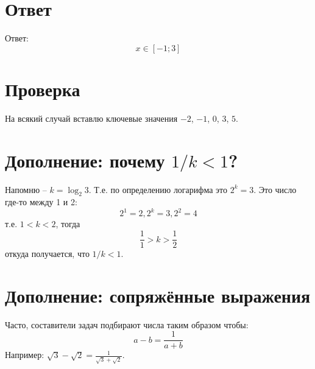 \documentclass{article}
\begin{document}
\section{Ответ}
Ответ:
$$x\in{}[-1;3]$$

\section{Проверка}
На всякий случай вставлю ключевые значения $-2$, $-1$, $0$, $3$, $5$.

\section{Дополнение: почему $1/k<1$?}
Напомню -- $k=\log_{2}{3}$. Т.е. по определению логарифма это $2^k=3$. Это число где-то между 1 и 2:
$$2^1=2, 2^k=3, 2^2=4$$
т.е. $1<k<2$, тогда
$$\frac{1}{1}>k>\frac{1}{2}$$
откуда получается, что $1/k<1$.

\section{Дополнение: сопряжённые выражения}
Часто, составители задач подбирают числа таким образом чтобы:
$$a-b=\frac{1}{a+b}$$
Например: $\sqrt{3}-\sqrt{2}=\frac{1}{\sqrt{3}+\sqrt{2}}$.




\end{document}
